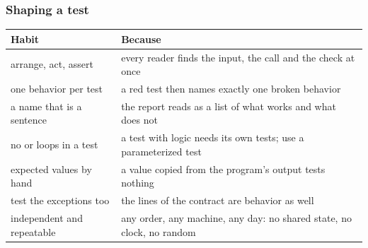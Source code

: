 \documentclass[aspectratio=169,10pt,compress]{beamer}
\begin{document}
\begin{frame}[t,fragile] \frametitle{Shaping a test}


\begin{table}
		\footnotesize
		\begin{tabular}{@{}L{0.26\textwidth}L{0.66\textwidth}@{}}
			\toprule
			\textbf{Habit} & \textbf{Because} \\
			\midrule
			arrange, act, assert         & every reader finds the input, the call and the check at once \\
			one behavior per test        & a red test then names exactly one broken behavior \\
			a name that is a sentence    & the report reads as a list of what works and what does not \\
			no  or loops in a test & a test with logic needs its own tests; use a parameterized test \\
			expected values by hand      & a value copied from the program's output tests nothing \\
			test the exceptions too      & the  lines of the contract are behavior as well \\
			independent and repeatable   & any order, any machine, any day: no shared state, no clock, no random \\
			\bottomrule
		\end{tabular}
\end{table}%
\end{frame}
\end{document}

